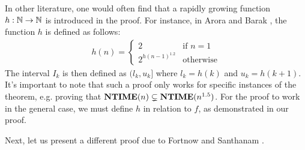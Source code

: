 \documentclass[11pt,twoside=off,numbers=noenddot]{scrbook}
\begin{document}
\begin{remark}
  In other literature, one would often find that a rapidly growing function $h : \mathbb N \to \mathbb N$ is introduced in the proof. For instance, in Arora and Barak \cite{arora2009computational}, the function $h$ is defined as follows:
  \begin{align*}
    h(n) =
    \begin{cases}
      2 & \text{if $n = 1$} \\
      2^{h(n - 1)^{1.2}} & \text{otherwise}
    \end{cases}
  \end{align*}
  The interval $I_k$ is then defined as $(l_k, u_k]$ where $l_k = h(k)$ and $u_k = h(k + 1)$. It's important to note that such a proof only works for specific instances of the theorem, e.g. proving that $\textbf{NTIME}(n) \subsetneq \textbf{NTIME}(n^{1.5})$. For the proof to work in the general case, we must define $h$ in relation to $f$, as demonstrated in our proof.
\end{remark}

Next, let us present a different proof due to Fortnow and Santhanam \cite{fortnow2011robust}.
\end{document}
